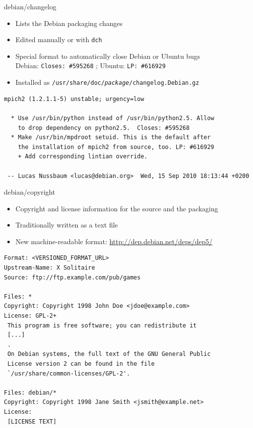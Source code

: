 \documentclass[10pt,final]{beamer}
\begin{document}
\begin{frame}[fragile]{debian/changelog}
	\begin{itemize}
		\item Lists the Debian packaging changes
		\item Edited manually or with \texttt{dch}
		\item Special format to automatically close Debian or Ubuntu bugs\\
			Debian: \texttt{Closes:~\#595268} ; Ubuntu: \texttt{LP:~\#616929}
		\item Installed as \texttt{/usr/share/doc/\textit{package}/changelog.Debian.gz}
	\end{itemize}
\begin{lstlisting}[basicstyle=\ttfamily\footnotesize]
mpich2 (1.2.1.1-5) unstable; urgency=low

  * Use /usr/bin/python instead of /usr/bin/python2.5. Allow
    to drop dependency on python2.5.  Closes: #595268
  * Make /usr/bin/mpdroot setuid. This is the default after
    the installation of mpich2 from source, too. LP: #616929
    + Add corresponding lintian override.

 -- Lucas Nussbaum <lucas@debian.org>  Wed, 15 Sep 2010 18:13:44 +0200
\end{lstlisting}
\end{frame}

\begin{frame}[fragile]{debian/copyright}
	\hbr
	\begin{itemize}
		\item Copyright and license information for the source and the packaging
		\item Traditionally written as a text file
		\item New machine-readable format: \url{http://dep.debian.net/deps/dep5/}
	\end{itemize}
\begin{lstlisting}[basicstyle=\ttfamily\footnotesize]
Format: <VERSIONED_FORMAT_URL>
Upstream-Name: X Solitaire
Source: ftp://ftp.example.com/pub/games

Files: *
Copyright: Copyright 1998 John Doe <jdoe@example.com>
License: GPL-2+
 This program is free software; you can redistribute it
 [...]
 .
 On Debian systems, the full text of the GNU General Public
 License version 2 can be found in the file
 `/usr/share/common-licenses/GPL-2'.

Files: debian/*
Copyright: Copyright 1998 Jane Smith <jsmith@example.net>
License:
 [LICENSE TEXT]
\end{lstlisting}
\end{frame}
\end{document}
